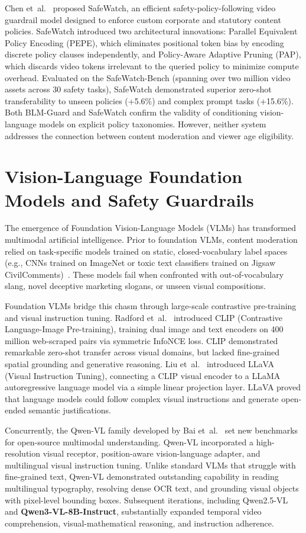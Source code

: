 \documentclass[12pt,a4paper]{report}
\begin{document}
Chen et~al.~\cite{safewatch2025} proposed SafeWatch, an efficient safety-policy-following video guardrail model designed to enforce custom corporate and statutory content policies. SafeWatch introduced two architectural innovations: Parallel Equivalent Policy Encoding (PEPE), which eliminates positional token bias by encoding discrete policy clauses independently, and Policy-Aware Adaptive Pruning (PAP), which discards video tokens irrelevant to the queried policy to minimize compute overhead. Evaluated on the SafeWatch-Bench (spanning over two million video assets across 30 safety tasks), SafeWatch demonstrated superior zero-shot transferability to unseen policies (+5.6\%) and complex prompt tasks (+15.6\%). Both BLM-Guard and SafeWatch confirm the validity of conditioning vision-language models on explicit policy taxonomies. However, neither system addresses the connection between content moderation and viewer age eligibility.

\section{Vision-Language Foundation Models and Safety Guardrails}

The emergence of Foundation Vision-Language Models (VLMs) has transformed multimodal artificial intelligence. Prior to foundation VLMs, content moderation relied on task-specific models trained on static, closed-vocabulary label spaces (e.g., CNNs trained on ImageNet or toxic text classifiers trained on Jigsaw CivilComments)~\cite{devlin2019bert,he2016deep}. These models fail when confronted with out-of-vocabulary slang, novel deceptive marketing slogans, or unseen visual compositions.

Foundation VLMs bridge this chasm through large-scale contrastive pre-training and visual instruction tuning. Radford et~al.~\cite{radford2021learning} introduced CLIP (Contrastive Language-Image Pre-training), training dual image and text encoders on 400 million web-scraped pairs via symmetric InfoNCE loss. CLIP demonstrated remarkable zero-shot transfer across visual domains, but lacked fine-grained spatial grounding and generative reasoning. Liu et~al.~\cite{liu2023visual} introduced LLaVA (Visual Instruction Tuning), connecting a CLIP visual encoder to a LLaMA autoregressive language model via a simple linear projection layer. LLaVA proved that language models could follow complex visual instructions and generate open-ended semantic justifications.

Concurrently, the Qwen-VL family developed by Bai et~al.~\cite{bai2023qwen} set new benchmarks for open-source multimodal understanding. Qwen-VL incorporated a high-resolution visual receptor, position-aware vision-language adapter, and multilingual visual instruction tuning. Unlike standard VLMs that struggle with fine-grained text, Qwen-VL demonstrated outstanding capability in reading multilingual typography, resolving dense OCR text, and grounding visual objects with pixel-level bounding boxes. Subsequent iterations, including Qwen2.5-VL and \textbf{Qwen3-VL-8B-Instruct}, substantially expanded temporal video comprehension, visual-mathematical reasoning, and instruction adherence.
\end{document}
